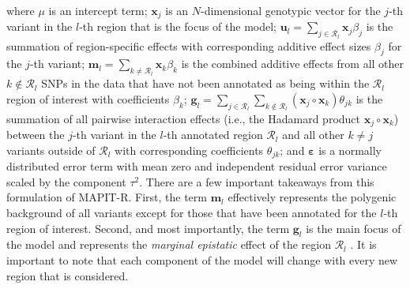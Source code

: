 \documentclass[10pt,a4paper]{article}
\newcommand{\bg}{\mathbf{g}}
\newcommand{\bx}{\mathbf{x}}
\newcommand{\bu}{\mathbf{u}}
\newcommand{\bfm}{\mathbf{m}}
\newcommand{\bvarepsilon}{\boldsymbol\varepsilon}
\begin{document}
where $\mu$ is an intercept term; $\bx_j$ is an $N$-dimensional genotypic vector for the $j$-th variant in the $l$-th region that is the focus of the model; $\bu_l = \sum_{j\in\mathcal{R}_l}\bx_j\beta_j$ is the summation of region-specific effects with corresponding additive effect sizes $\beta_j$ for the $j$-th variant; $\bfm_l = \sum_{k\ne\mathcal{R}_l}\bx_k\beta_k$ is the combined additive effects from all other $k\not\in\mathcal{R}_l$ SNPs in the data that have not been annotated as being within the $\mathcal{R}_l$ region of interest with coefficients $\beta_k$; $\bg_l = \sum_{j\in\mathcal{R}_l}\sum_{k\not\in\mathcal{R}_l}(\bx_j\circ\bx_k)\theta_{jk}$ is the summation of all pairwise interaction effects (i.e., the Hadamard product $\bx_j\circ\bx_k$) between the $j$-th variant in the $l$-th annotated region $\mathcal{R}_l$ and all other $k\ne j$ variants outside of $\mathcal{R}_l$ with corresponding coefficients $\theta_{jk}$; and $\bvarepsilon$ is a normally distributed error term with mean zero and independent residual error variance scaled by the component $\tau^2$. There are a few important takeaways from this formulation of MAPIT-R. First, the term $\bfm_l$ effectively represents the polygenic background of all variants except for those that have been annotated for the $l$-th region of interest. Second, and most importantly, the term $\bg_l$ is the main focus of the model and represents the \textit{marginal epistatic} effect of the region $\mathcal{R}_l$ \cite{Crawford2017a,Crawford:2018aa}. It is important to note that each component of the model will change with every new region that is considered.
\end{document}
